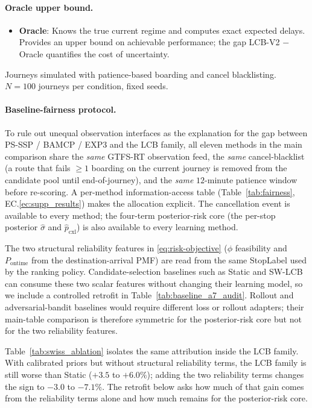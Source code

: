 \documentclass[opre,dblanonrev]{informs4}
\begin{document}
\paragraph{Oracle upper bound.}
\begin{itemize}
    \item \textbf{Oracle}: Knows the true current regime and computes exact expected delays. Provides an upper bound on achievable performance; the gap LCB-V2 $-$ Oracle quantifies the cost of uncertainty.
\end{itemize}

Journeys simulated with patience-based boarding and cancel blacklisting. $N{=}100$ journeys per condition, fixed seeds.

\paragraph{Baseline-fairness protocol.} To rule out unequal
observation interfaces as the explanation for the gap between
PS-SSP / BAMCP / EXP3 and the LCB family, all eleven methods in the
main comparison share the \emph{same} GTFS-RT observation feed, the
\emph{same} cancel-blacklist (a route that fails $\geq 1$ boarding on
the current journey is removed from the candidate pool until
end-of-journey), and the \emph{same} $12$-minute patience window
before re-scoring. A per-method information-access table
(Table~\ref{tab:fairness}, EC.\ref{ec:supp_results}) makes the
allocation explicit. The cancellation event is available to every
method; the four-term posterior-risk core (the per-stop posterior
$\hat\sigma$ and $\hat p_{\mathrm{cxl}}$) is also available to every
learning method.

The two structural reliability features in \eqref{eq:risk-objective}
($\phi$ feasibility and $P_{\mathrm{ontime}}$ from the
destination-arrival PMF) are read from the same StopLabel used by the
ranking policy. Candidate-selection baselines such as Static and
SW-LCB can consume these two scalar features without changing their
learning model, so we include a controlled retrofit in
Table~\ref{tab:baseline_a7_audit}. Rollout and adversarial-bandit
baselines would require different loss or rollout adapters; their
main-table comparison is therefore symmetric for the posterior-risk
core but not for the two reliability features.

Table~\ref{tab:swiss_ablation} isolates the same attribution inside
the LCB family. With calibrated priors but without structural
reliability terms, the LCB family is still worse than Static
($+3.5$ to $+6.0\%$); adding the two reliability terms changes the
sign to $-3.0$ to $-7.1\%$. The retrofit below asks how much of that
gain comes from the reliability terms alone and how much remains for
the posterior-risk core.
\end{document}
